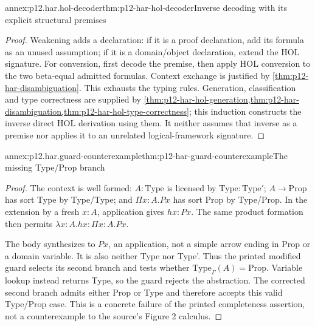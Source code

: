 \begin{annexitem}{annex:p12.har.hol-decoder}{thm:p12-har-hol-decoder}{Inverse decoding with its explicit structural premises}
\begin{proof}
Weakening adds a declaration: if it is a proof declaration, add its
formula as an unused assumption; if it is a domain/object declaration,
extend the HOL signature. For conversion, first decode the premise,
then apply HOL conversion to the two beta-equal admitted formulas.
Context exchange is justified by \cref{thm:p12-har-disambiguation}.
This exhausts the typing rules. Generation, classification and type
correctness are supplied by
\cref{thm:p12-har-hol-generation,thm:p12-har-disambiguation,thm:p12-har-hol-type-correctness};
this induction constructs the inverse direct HOL derivation using them.
It neither assumes that inverse as a premise nor applies it to an
unrelated logical-framework signature.
\end{proof}
\end{annexitem}

\begin{annexitem}{annex:p12.har.guard-counterexample}{thm:p12-har-guard-counterexample}{The missing Type/Prop branch}
\begin{proof}
The context is well formed: \(A:\mathrm{Type}\) is licensed by
\(\mathrm{Type}:\mathrm{Type}'\); \(A\to\mathrm{Prop}\)
has sort Type by Type/Type; and \(\Pi x:A.Px\) has sort Prop
by Type/Prop. In the extension by a fresh \(x:A\), application
gives \(hx:Px\). The same product formation then permits
\(\lambda x:A.hx:\Pi x:A.Px\).

The body synthesizes to \(Px\), an application, not a simple arrow
ending in Prop or a domain variable. It is also neither Type nor Type'.
Thus the printed modified guard selects its second branch and tests
whether \(\mathrm{Type}_\Gamma(A)=\mathrm{Prop}\). Variable
lookup instead returns Type, so the guard rejects the abstraction.
The corrected second branch admits either Prop or Type and therefore
accepts this valid Type/Prop case. This is a concrete failure of the
printed completeness assertion, not a counterexample to the source's
Figure 2 calculus.
\end{proof}
\end{annexitem}


